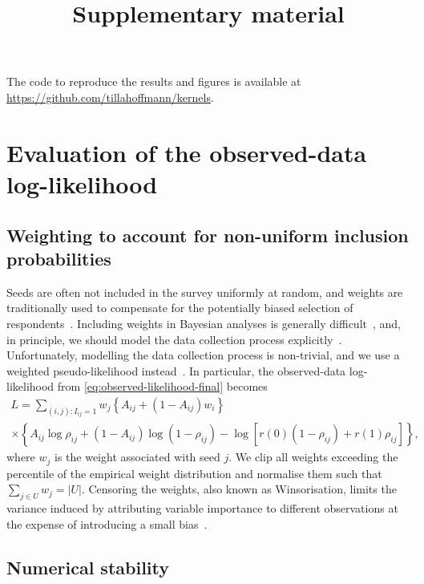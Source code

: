 \documentclass{scrartcl}
\title{Supplementary material}
\author{}
\date{}
\newcommand{\card}[1]{\left|#1\right|}
\newcommand{\seeds}{U}
\begin{document}
\maketitle
The code to reproduce the results and figures is available at \url{https://github.com/tillahoffmann/kernels}.

\appendix
{}

\section{Evaluation of the observed-data log-likelihood}

\subsection{Weighting to account for non-uniform inclusion probabilities}

Seeds are often not included in the survey uniformly at random, and weights are traditionally used to compensate for the potentially biased selection of respondents~\cite{Kish1992}. Including weights in Bayesian analyses is generally difficult~\cite{Gelman2007}, and, in principle, we should model the data collection process explicitly~\cite[chapter~8]{Gelman2013}. Unfortunately, modelling the data collection process is non-trivial, and we use a weighted pseudo-likelihood instead~\cite{Pfeffermann1996}. In particular, the observed-data log-likelihood from \cref{eq:observed-likelihood-final} becomes
\begin{multline}
    L = \sum_{(i,j):I_{ij} = 1} w_j\left\{A_{ij} + (1 - A_{ij})w_i\right\}
    \\\times\left\{A_{ij}\log\rho_{ij} + (1-A_{ij})\log(1-\rho_{ij})-\log\left[r(0)(1 - \rho_{ij}) + r(1)\rho_{ij}\right]\right\},\label{eq:survey-weighted-log-likelihood}
\end{multline}
where $w_j$ is the weight associated with seed $j$. We clip all weights exceeding the  percentile of the empirical weight distribution and normalise them such that $\sum_{j\in\seeds}w_j=\card{\seeds}$. Censoring the weights, also known as Winsorisation, limits the variance induced by attributing variable importance to different observations at the expense of introducing a small bias~\cite{Kish1992}.

\subsection{Numerical stability\label{app:numeric-stability}}
\end{document}
